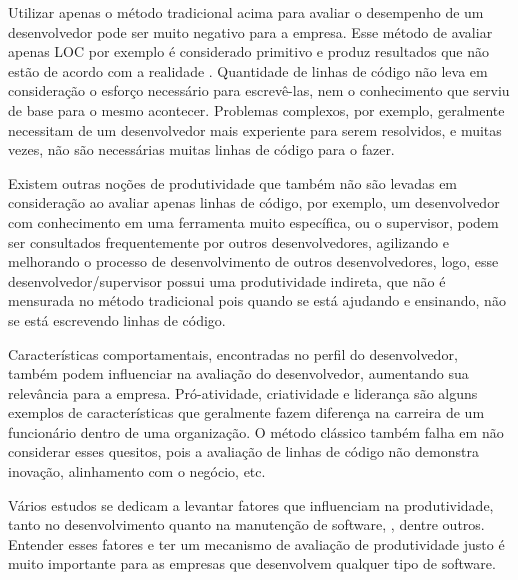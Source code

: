 Utilizar apenas o método tradicional acima para avaliar o desempenho de um desenvolvedor pode ser muito negativo para a empresa. Esse método de avaliar apenas LOC por exemplo é considerado primitivo e produz resultados que não estão de acordo com a realidade \cite{Symons2010}. Quantidade de linhas de código não leva em consideração o esforço necessário para escrevê-las, nem o conhecimento que serviu de base para o mesmo acontecer. Problemas complexos, por exemplo, geralmente necessitam de um desenvolvedor mais experiente para serem resolvidos, e muitas vezes, não são necessárias muitas linhas de código para o fazer.

Existem outras noções de produtividade que também não são levadas em consideração ao avaliar apenas linhas de código, por exemplo, um desenvolvedor com conhecimento em uma ferramenta muito específica, ou o supervisor, podem ser consultados frequentemente por outros desenvolvedores, agilizando e melhorando o processo de desenvolvimento de outros desenvolvedores, logo, esse desenvolvedor/supervisor possui uma produtividade indireta, que não é mensurada no método tradicional pois quando se está ajudando e ensinando, não se está escrevendo linhas de código.

Características comportamentais, encontradas no perfil do desenvolvedor, também podem influenciar na avaliação do desenvolvedor, aumentando sua relevância para a empresa. Pró-atividade, criatividade e liderança são alguns exemplos de características que geralmente fazem diferença na carreira de um funcionário dentro de uma organização. O método clássico também falha em não considerar esses quesitos, pois a avaliação de linhas de código não demonstra inovação, alinhamento com o negócio, etc.

Vários estudos se dedicam a levantar fatores que influenciam na produtividade, tanto no desenvolvimento quanto na manutenção de software, \cite{deBarrosSampaio2010, Wagner2008, Calow1991, Vosburgh1984}, dentre outros. Entender esses fatores e ter um mecanismo de avaliação de produtividade justo é muito importante para as empresas que desenvolvem qualquer tipo de software.


